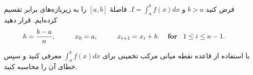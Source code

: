 فرض کنید 
\(b>a\)
و
\(I =\int_{a}^{b} f(x) dx\).
 فاصلهٔ 
\([a,b]\)
را به زیربازه‌های برابر تقسیم کرده‌ایم. قرار دهید
\begin{align*}
	& h= \frac{b-a}{n}, \hspace*{1cm} x_0=a, \hspace*{1cm} x_{i+1} = x_i + h \hspace*{.5cm} \textbf{for} \hspace*{.3cm} 1 \leq i \leq n-1.
\end{align*}

با استفاده از قاعده نقطه میانی مرکب تخمینی برای 
\(\int_{a}^{b} f(x) dx\)
معرفی کنید و سپس خطای آن را محاسبه کنید.

